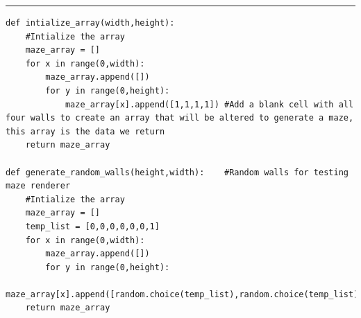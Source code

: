 \documentclass{article}
\begin{document}
\textcolor[RGB]{220,220,220}{\rule{\linewidth}{0.2pt}}
\begin{lstlisting}
def intialize_array(width,height):
    #Intialize the array
    maze_array = []
    for x in range(0,width):
        maze_array.append([])
        for y in range(0,height):
            maze_array[x].append([1,1,1,1]) #Add a blank cell with all four walls to create an array that will be altered to generate a maze, this array is the data we return
    return maze_array

def generate_random_walls(height,width):    #Random walls for testing maze renderer
    #Intialize the array
    maze_array = []
    temp_list = [0,0,0,0,0,0,1]
    for x in range(0,width):
        maze_array.append([])
        for y in range(0,height):
            maze_array[x].append([random.choice(temp_list),random.choice(temp_list),random.choice(temp_list),random.choice(temp_list)])
    return maze_array


\end{lstlisting}
\end{document}
